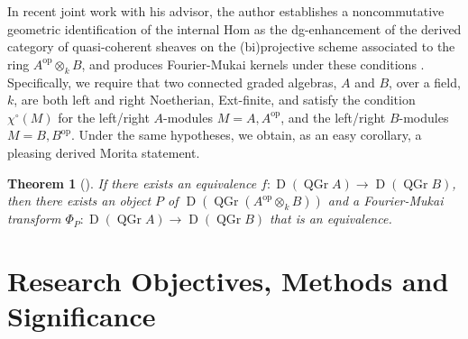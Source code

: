 \documentclass[11pt]{article}
\newtheorem{theorem}{Theorem}[section]
\begin{document}
In recent joint work with his advisor, the author establishes a noncommutative geometric identification of the internal Hom as the dg-enhancement of the derived category of quasi-coherent sheaves on the (bi)projective scheme associated to the ring $A^{\operatorname{op}} \otimes_k B$, and produces Fourier-Mukai kernels under these conditions \cite{BF17}.
Specifically, we require that two connected graded algebras, $A$ and $B$, over a field, $k$, are both left and right Noetherian, Ext-finite, and satisfy the condition $\chi^\circ(M)$ for the left/right $A$-modules $M = A, A^{\operatorname{op}}$, and the left/right $B$-modules $M = B, B^{\operatorname{op}}$.
Under the same hypotheses, we obtain, as an easy corollary, a pleasing derived Morita statement.
\begin{theorem}[\cite{BF17}]
  If there exists an equivalence
  $f \colon \operatorname{D}(\operatorname{QGr} A) \to \operatorname{D}(\operatorname{QGr} B)$,
  then there exists an object $P$ of $\operatorname{D}\left(\operatorname{QGr} \left(A^{\operatorname{op}} \otimes_k B\right)\right)$ and a Fourier-Mukai transform
  $\Phi_P \colon \operatorname{D}(\operatorname{QGr} A) \to \operatorname{D}(\operatorname{QGr} B)$
  that is an equivalence.
\end{theorem}



\section{Research Objectives, Methods and Significance}
\end{document}
